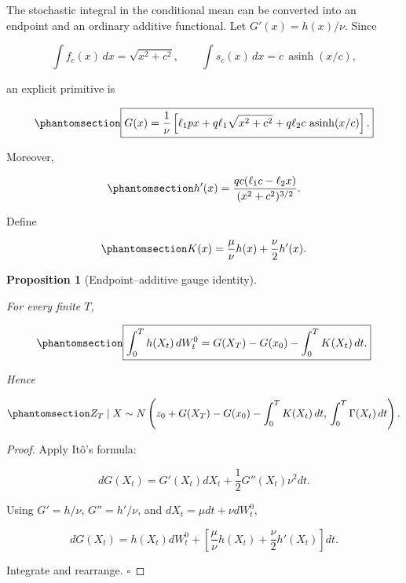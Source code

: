 \documentclass[
  english,
  11pt,
  letterpaper,
  DIV=11,
  numbers=noendperiod]{scrartcl}
\theoremstyle{plain}
\theoremstyle{plain}
\theoremstyle{plain}
\theoremstyle{plain}
\newtheorem{proposition}{Proposition}[section]
\theoremstyle{remark}
\begin{document}
The stochastic integral in the conditional mean can be converted into an
endpoint and an ordinary additive functional. Let \(G'(x)=h(x)/\nu\).
Since

\[
\int f_c(x)\,dx=\sqrt{x^2+c^2},
\qquad
\int s_c(x)\,dx=c\,\operatorname{asinh}(x/c),
\]

an explicit primitive is

\begin{equation}\protect\phantomsection\label{eq-gauge-primitive}{
\boxed{
G(x)=\frac1\nu
\left[
\ell_1px
+q\ell_1\sqrt{x^2+c^2}
+q\ell_2c\,\operatorname{asinh}(x/c)
\right].
}
}\end{equation}

Moreover,

\begin{equation}\protect\phantomsection\label{eq-h-prime}{
h'(x)
=\frac{qc(\ell_1c-\ell_2x)}
{(x^2+c^2)^{3/2}}.
}\end{equation}

Define

\begin{equation}\protect\phantomsection\label{eq-gauge-K}{
K(x)
=\frac{\mu}{\nu}h(x)+\frac{\nu}{2}h'(x).
}\end{equation}

\begin{proposition}[Endpoint--additive gauge
identity]\protect\hypertarget{prp-ito-gauge}{}\label{prp-ito-gauge}

For every finite \(T\),

\begin{equation}\protect\phantomsection\label{eq-ito-gauge}{
\boxed{
\int_0^Th(X_t)\,dW_t^0
=G(X_T)-G(x_0)-\int_0^TK(X_t)\,dt.
}
}\end{equation}

Hence

\begin{equation}\protect\phantomsection\label{eq-gauged-conditional-law}{
Z_T\mid X
\sim
N\left(
z_0+G(X_T)-G(x_0)-\int_0^TK(X_t)\,dt,\,
\int_0^T\Gamma(X_t)\,dt
\right).
}\end{equation}

\end{proposition}

\begin{proof}
Apply Itô's formula:

\[
dG(X_t)
=G'(X_t)dX_t+\frac12G''(X_t)\nu^2dt.
\]

Using \(G'=h/\nu\), \(G''=h'/\nu\), and \(dX_t=\mu dt+\nu dW_t^0\),

\[
dG(X_t)
=h(X_t)dW_t^0
+\left[
\frac{\mu}{\nu}h(X_t)+\frac{\nu}{2}h'(X_t)
\right]dt.
\]

Integrate and rearrange. \(\square\)
\end{proof}
\end{document}
